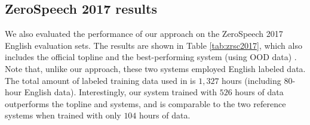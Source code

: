 \documentclass[a4paper]{article}
\begin{document}
\subsection{ZeroSpeech 2017 results}
\begin{table}[!t]
\renewcommand\arraystretch{0.80}
\centering
\caption{ABX error rates of  BNFs  on ZeroSpeech 2017 English sets. Models are trained with  Libri-light using Dutch labels.}
\label{tab:zrsc2017}
\end{table}
We also evaluated the performance of our approach on the ZeroSpeech 2017 English evaluation sets. The results are shown in Table \ref{tab:zrsc2017}, which also includes the official topline \cite{dunbar2017zero}  and the best-performing system (using OOD data) \cite{shibata2017composite}. Note that, unlike our approach, these two systems employed English labeled data. The total amount of labeled training data used in \cite{shibata2017composite} is $1,327$ hours (including $80$-hour English data).
Interestingly, our system trained with $526$ hours of data  outperforms the topline and \cite{shibata2017composite} systems, and is comparable to the two reference systems when trained with only $104$ hours of data.
\end{document}
